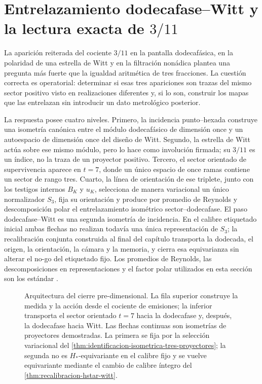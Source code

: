 \chapter{Entrelazamiento dodecafase--Witt y la lectura exacta de \texorpdfstring{\(3/11\)}{3/11}}
\label{chap:entrelazador-accion}

La aparición reiterada del cociente \(3/11\) en la pantalla dodecafásica,
en la polaridad de una estrella de Witt y en la filtración nonádica plantea
una pregunta más fuerte que la igualdad aritmética de tres fracciones. La
cuestión correcta es operatorial: determinar si esas tres apariciones son
trazas del mismo sector positivo visto en realizaciones diferentes y, si lo
son, construir los mapas que las entrelazan sin introducir un dato
metrológico posterior.

La respuesta posee cuatro niveles. Primero, la incidencia punto--hexada
construye una isometría canónica entre el módulo dodecafásico de dimensión
once y un autoespacio de dimensión once del diseño de Witt. Segundo, la
estrella de Witt actúa sobre ese mismo módulo, pero lo hace como involución
firmada; su \(3/11\) es un índice, no la traza de un proyector positivo.
Tercero, el sector orientado de supervivencia aparece en \(t=7\), donde un
único espacio de once ramas contiene un sector de rango tres. Cuarto, la
línea de orientación de ese triplete, junto con los testigos internos
\(B_K\) y \(u_K\), selecciona de manera variacional un único normalizador
\(S_3\), fija su orientación y produce por promedio de Reynolds y
descomposición polar el entrelazamiento isométrico sector--dodecafase. El
paso dodecafase--Witt es una segunda isometría de incidencia. En el calibre
etiquetado inicial ambas flechas no realizan todavía una única representación
de \(S_3\); la recalibración conjunta construida al final del capítulo transporta
la dodecada, el origen, la orientación, la cámara y la memoria, y cierra esa
equivarianza sin alterar el no-go del etiquetado fijo.
Los promedios de Reynolds, las descomposiciones en representaciones y el
factor polar utilizados en esta sección son los estándar
\cite{Serre1977Representations,HornJohnson2013}.

\begin{figure}[htbp]
\centering

\caption{Arquitectura del cierre pre-dimensional. La fila superior construye
la medida y la acción desde el cociente de emisiones; la inferior transporta
el sector orientado \(t=7\) hacia la dodecafase y, después, la dodecafase hacia
Witt. Las flechas continuas son isometrías de proyectores demostradas. La
primera se fija por la selección variacional del
\cref{thm:identificacion-isometrica-tres-proyectores}; la segunda no es
\(H_*\)-equivariante en el calibre fijo y se vuelve equivariante mediante el
cambio de calibre íntegro del \cref{thm:recalibracion-hstar-witt}.}
\label{fig:entrelazador-accion}
\end{figure}

